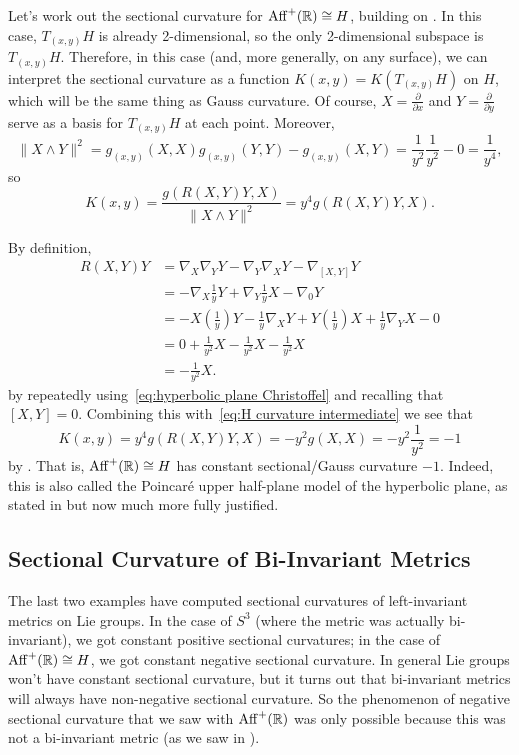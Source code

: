 \begin{example}
	Let's work out the sectional curvature for $\operatorname{Aff}^+(\mathbb{R}) \cong H$, building on . In this case, $T_{(x,y)}H$ is already 2-dimensional, so the only 2-dimensional subspace is $T_{(x,y)}H$. Therefore, in this case (and, more generally, on any surface), we can interpret the sectional curvature as a function $K(x,y) = K(T_{(x,y)}H)$ on $H$, which will be the same thing as Gauss curvature. Of course, $X = \frac{\partial}{\partial x}$ and $Y = \frac{\partial}{\partial y}$ serve as a basis for $T_{(x,y)}H$ at each point. Moreover, 
	\[
		\|X \wedge Y \|^2 = g_{(x,y)}(X,X) g_{(x,y)}(Y,Y) - g_{(x,y)}(X,Y) = \frac{1}{y^2} \frac{1}{y^2} - 0 = \frac{1}{y^4},
	\]
	so 
	\begin{equation}\label{eq:H curvature intermediate}
		K(x,y) = \frac{g(R(X,Y)Y,X)}{\|X \wedge Y\|^2} = y^4 g(R(X,Y)Y,X).
	\end{equation}
	
	By definition,
	\begin{align*}
		R(X,Y)Y & = \nabla_X \nabla_Y Y - \nabla_Y \nabla_X Y - \nabla_{[X,Y]}Y \\
		& = - \nabla_X \frac{1}{y}Y + \nabla_Y \frac{1}{y}X - \nabla_0 Y \\
		& = -X\left(\frac{1}{y}\right)Y - \frac{1}{y} \nabla_X Y + Y \left(\frac{1}{y}\right) X + \frac{1}{y} \nabla_Y X - 0 \\
		& = 0 + \frac{1}{y^2} X - \frac{1}{y^2} X - \frac{1}{y^2}X \\
		& = -\frac{1}{y^2}X.
	\end{align*}
	by repeatedly using~\eqref{eq:hyperbolic plane Christoffel} and recalling that $[X,Y] = 0$. Combining this with~\eqref{eq:H curvature intermediate} we see that
	\[
		K(x,y) = y^4 g(R(X,Y)Y,X) = -y^2g(X,X) = -y^2 \frac{1}{y^2} = -1
	\]
	by . That is, $\operatorname{Aff}^+(\mathbb{R}) \cong H$ has constant sectional/Gauss curvature $-1$. Indeed, this is also called the Poincaré upper half-plane model of the hyperbolic plane, as stated in  but now much more fully justified.
\end{example}

\subsection{Sectional Curvature of Bi-Invariant Metrics} 
\label{sub:sectional curvature bi-invariant}

The last two examples have computed sectional curvatures of left-invariant metrics on Lie groups. In the case of $S^3$ (where the metric was actually bi-invariant), we got constant positive sectional curvatures; in the case of $\operatorname{Aff}^+(\mathbb{R}) \cong H$, we got constant negative sectional curvature. In general Lie groups won't have constant sectional curvature, but it turns out that bi-invariant metrics will always have non-negative sectional curvature. So the phenomenon of negative sectional curvature that we saw with $\operatorname{Aff}^+(\mathbb{R})$ was only possible because this was not a bi-invariant metric (as we saw in ).

